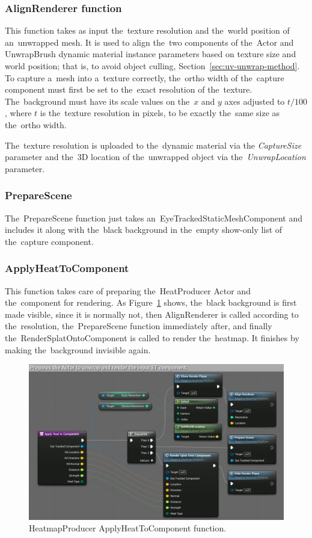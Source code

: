 \subsubsection*{AlignRenderer function}

This function takes as input the~texture resolution and the~world position of an~unwrapped mesh. It is used to align the~two components of the~Actor and UnwrapBrush dynamic material instance parameters based on texture size and world position; that is, to avoid object culling, Section~\ref{sec:uv-unwrap-method}. To capture a~mesh into a~texture correctly, the~ortho width of the~capture component must first be set to the~exact resolution of the~texture. The~background must have its scale values on the~$x$ and $y$ axes adjusted to $t/100$, where $t$ is the~texture resolution in pixels, to be exactly the~same size as the~ortho width.

The~texture resolution is uploaded to the~dynamic material via the
\emph{CaptureSize} parameter and the~3D location of the~unwrapped object via the~\emph{UnwrapLocation} parameter.

\subsubsection*{PrepareScene}
The~PrepareScene function just takes an~EyeTrackedStaticMeshComponent and includes it along with the~black background in the~empty show-only list of the~capture component. 

\subsubsection*{ApplyHeatToComponent}

This function takes care of preparing the~HeatProducer Actor and the~component for rendering. As Figure~\ref{fig:apply-heat-function} shows, the~black background is first made visible, since it is normally not, then AlignRenderer is called according to the~resolution, the~PrepareScene function immediately after, and finally the~RenderSplatOntoComponent is called to render the~heatmap. It finishes by making the~background invisible again. 

\begin{figure}[!ht]
    \centering
    \includegraphics[width=\textwidth]{img/apply-heat-to-component.png}
    \caption{HeatmapProducer ApplyHeatToComponent function.}
    \label{fig:apply-heat-function}
\end{figure}

